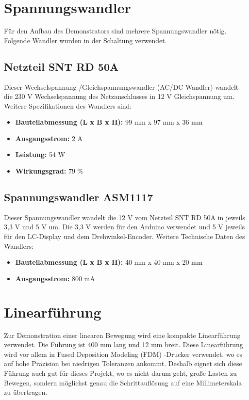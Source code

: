 \section{Spannungswandler}
Für den Aufbau des Demonstrators sind mehrere Spannungswandler nötig. Folgende Wandler wurden in der Schaltung verwendet.
\subsection{Netzteil SNT RD 50A}
Dieser Wechselspannung-/Gleichspannungswandler (AC/DC-Wandler) wandelt die 230 V Wechselspannung des Netzanschlusses in 12 V Gleichspannung um. %
Weitere Spezifikationen des Wandlers sind:
\begin{itemize}
	\item \textbf{Bauteilabmessung (L x B x H):} 99 mm x 97 mm x 36 mm
	\item \textbf{Ausgangsstrom:} 2 A
	\item \textbf{Leistung:} 54 W
	\item \textbf{Wirkungsgrad:} 79 \% 
\end{itemize} 
\cite{Meanwell.2019}

\subsection{Spannungswandler ASM1117}
Dieser Spannungswandler wandelt die 12 V vom Netzteil SNT RD 50A in jeweils 3,3 V und 5 V um. Die 3,3 V werden für den Arduino verwendet und 5 V jeweils für den LC-Display und dem Drehwinkel-Encoder. Weitere Technische Daten des Wandlers:
\begin{itemize}
	\item \textbf{Bauteilabmessung (L x B x H):} 40 mm x 40 mm x 20 mm 
	\item \textbf{Ausgangsstrom:} 800 mA
\end{itemize}
	\cite{AMS}
	
\section{Linearführung}
Zur Demonstration einer linearen Bewegung wird eine kompakte Linearführung verwendet. Die Führung ist 400 mm lang und 12 mm breit. Diese Linearführung wird vor allem in Fused Deposition Modeling (FDM) -Drucker verwendet, wo es auf hohe Präzision bei niedrigen Toleranzen ankommt. Deshalb eignet sich diese Führung auch gut für dieses Projekt, wo es nicht darum geht, große Lasten zu Bewegen, sondern möglichst genau die Schrittauflösung auf eine Millimeterskala zu übertragen.

